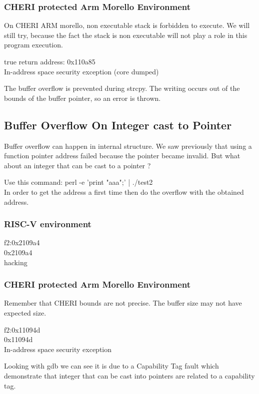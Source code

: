 \documentclass[a4paper, 11pt]{article}
\begin{document}
\subsubsection{CHERI protected Arm Morello Environment}
On CHERI ARM \Gls{morello}, non executable stack is forbidden to execute. We will still try, because the fact the stack is non executable will not play a role in this program execution.
\begin{tcolorbox}[colback=gray!5!white, colframe=blue!75!black, title=Execution on CHERI environment]
true return address: 0x110a85\\
In-address space security exception (core dumped)
\end{tcolorbox}
The buffer overflow is prevented during strcpy. The writing occurs out of the bounds of the buffer pointer, so an error is thrown.
\subsection{Buffer Overflow On Integer cast to Pointer}
Buffer overflow can happen in internal structure. We saw previously that using a function pointer address failed because the pointer became invalid. But what about an integer that can be cast to a pointer ?


Use this command: perl -e 'print "aaa";' | ./test2 \\
In order to get the address a first time then do the overflow with the obtained address.
\subsubsection{RISC-V environment}

\begin{tcolorbox}[colback=gray!5!white, colframe=gray!75!black, title=Output on classic \Gls{risc-v} environment (No CHERI protection)]
f2:0x2109a4\\
0x2109a4\\
hacking
\end{tcolorbox}
\subsubsection{CHERI protected Arm Morello Environment}
Remember that CHERI bounds are not precise. The buffer size may not have expected size.
\begin{tcolorbox}[colback=gray!5!white, colframe=blue!75!black, title=Execution on CHERI environment]
f2:0x11094d\\
0x11094d\\
In-address space security exception
\end{tcolorbox}
Looking with \acrshort{gdb} we can see it is due to a Capability Tag fault which demonstrate that integer that can be cast into pointers are related to a capability tag.
\end{document}

